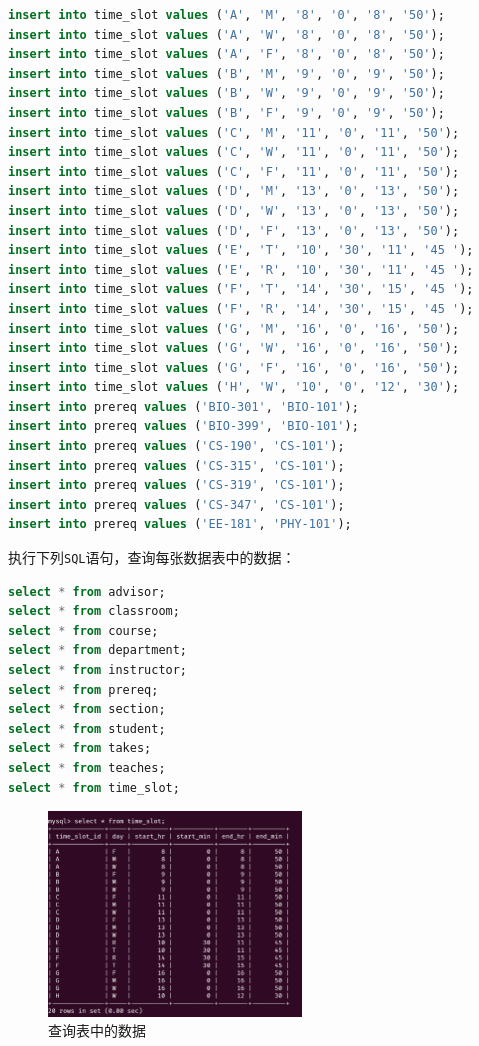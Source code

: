 \documentclass{article}
\begin{document}
\begin{lstlisting}[language=sql]
insert into time_slot values ('A', 'M', '8', '0', '8', '50');
insert into time_slot values ('A', 'W', '8', '0', '8', '50');
insert into time_slot values ('A', 'F', '8', '0', '8', '50');
insert into time_slot values ('B', 'M', '9', '0', '9', '50');
insert into time_slot values ('B', 'W', '9', '0', '9', '50');
insert into time_slot values ('B', 'F', '9', '0', '9', '50');
insert into time_slot values ('C', 'M', '11', '0', '11', '50');
insert into time_slot values ('C', 'W', '11', '0', '11', '50');
insert into time_slot values ('C', 'F', '11', '0', '11', '50');
insert into time_slot values ('D', 'M', '13', '0', '13', '50');
insert into time_slot values ('D', 'W', '13', '0', '13', '50');
insert into time_slot values ('D', 'F', '13', '0', '13', '50');
insert into time_slot values ('E', 'T', '10', '30', '11', '45 ');
insert into time_slot values ('E', 'R', '10', '30', '11', '45 ');
insert into time_slot values ('F', 'T', '14', '30', '15', '45 ');
insert into time_slot values ('F', 'R', '14', '30', '15', '45 ');
insert into time_slot values ('G', 'M', '16', '0', '16', '50');
insert into time_slot values ('G', 'W', '16', '0', '16', '50');
insert into time_slot values ('G', 'F', '16', '0', '16', '50');
insert into time_slot values ('H', 'W', '10', '0', '12', '30');
insert into prereq values ('BIO-301', 'BIO-101');
insert into prereq values ('BIO-399', 'BIO-101');
insert into prereq values ('CS-190', 'CS-101');
insert into prereq values ('CS-315', 'CS-101');
insert into prereq values ('CS-319', 'CS-101');
insert into prereq values ('CS-347', 'CS-101');
insert into prereq values ('EE-181', 'PHY-101');
\end{lstlisting}

执行下列\texttt{SQL}语句，查询每张数据表中的数据：

\begin{lstlisting}[language=sql]
select * from advisor;
select * from classroom;
select * from course;
select * from department;
select * from instructor;
select * from prereq;
select * from section;
select * from student;
select * from takes;
select * from teaches;
select * from time_slot;
\end{lstlisting}

\begin{figure}[H]
  \centering
  \includegraphics[width=0.6\textwidth]{img/12.png}
  \caption{查询表中的数据}
\end{figure}
\end{document}
